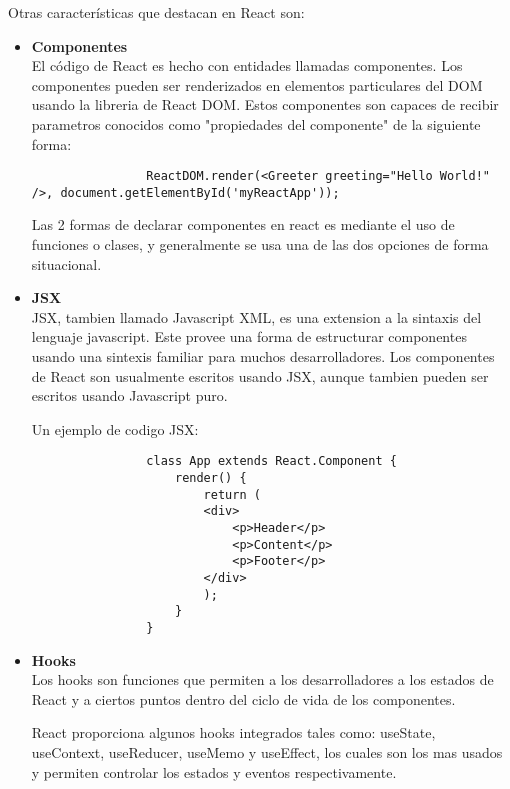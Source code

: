         Otras características que destacan en React son:\\

        \begin{itemize}
            \item \textbf{Componentes} \hfill \\

            El código de React es hecho con entidades llamadas componentes. Los componentes pueden ser renderizados en elementos particulares del DOM usando la libreria de React DOM. Estos componentes son capaces de recibir parametros conocidos como "propiedades del componente" de la siguiente forma: \hfill \\

            \begin{lstlisting}
                ReactDOM.render(<Greeter greeting="Hello World!" />, document.getElementById('myReactApp'));
            \end{lstlisting}

            Las 2 formas de declarar componentes en react es mediante el uso de funciones o clases, y generalmente se usa una de las dos opciones de forma situacional.

            \item \textbf{JSX} \hfill \\

            JSX, tambien llamado Javascript XML, es una extension a la sintaxis del lenguaje javascript. Este provee una forma de estructurar componentes usando una sintexis familiar para muchos desarrolladores. Los componentes de React son usualmente escritos usando JSX, aunque tambien pueden ser escritos usando Javascript puro.

            Un ejemplo de codigo JSX:

            \begin{lstlisting}
                class App extends React.Component {
                    render() {
                        return (
                        <div>
                            <p>Header</p>
                            <p>Content</p>
                            <p>Footer</p>
                        </div>
                        );
                    }
                }
            \end{lstlisting}

            \item \textbf{Hooks} \hfill \\

            Los hooks son funciones que permiten a los desarrolladores  a los estados de React y a ciertos puntos dentro del ciclo de vida de los componentes.

            React proporciona algunos hooks integrados tales como: useState, useContext, useReducer, useMemo y useEffect, los cuales son los mas usados y permiten controlar los estados y eventos respectivamente.


        \end{itemize}
        
